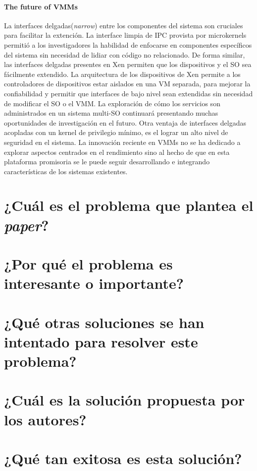 \paragraph{\textnormal{\textbf{The future of VMMs}}}
La interfaces delgadas(\emph{narrow}) entre los componentes del sistema son cruciales para facilitar la extención. La interface limpia de IPC provista por microkernels permitió a los investigadores la habilidad de enfocarse en componentes específicos del sistema sin necesidad de lidiar con código no relacionado. De forma similar, las interfaces delgadas presentes en Xen permiten que los dispositivos y el SO sea fácilmente extendido. La arquitectura de los dispositivos de Xen permite a los controladores de dispositivos estar aislados en una VM separada, para mejorar la confiabilidad y permitir que interfaces de bajo nivel sean extendidas sin necesidad de modificar el SO o el VMM. La exploración de cómo los servicios son administrados en un sistema multi-SO continuará presentando muchas oportunidades de investigación en el futuro. Otra ventaja de interfaces delgadas acopladas con un kernel de privilegio mínimo, es el lograr un alto nivel de seguridad en el sistema. La innovación reciente en VMMs no se ha dedicado a explorar aspectos centrados en el rendimiento sino al hecho de que en esta plataforma promisoria se le puede seguir desarrollando e integrando características de los sistemas existentes.

\section{¿Cuál es el problema que plantea el \textit{paper}?}

\section{¿Por qué el problema es interesante o importante?}

\section{¿Qué otras soluciones se han intentado para resolver este problema?}
     
\section{¿Cuál es la solución propuesta por los autores?}

\section{¿Qué tan exitosa es esta solución?} 




















